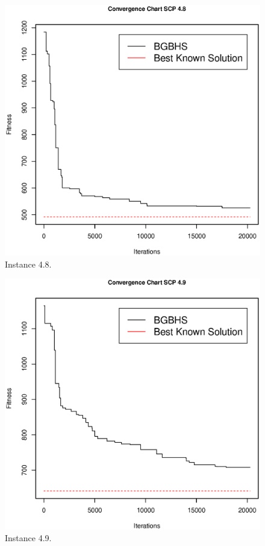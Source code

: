 \begin{figure}[]
\centering
\includegraphics[scale=.45]{Resultados/scp48.eps}
\caption{Instance 4.8.}
\label{fig:Instance.4.8}
\end{figure}

\begin{figure}[]
\centering
\includegraphics[scale=.45]{Resultados/scp49.eps}
\caption{Instance 4.9.}
\label{fig:Instance.4.9}
\end{figure}

